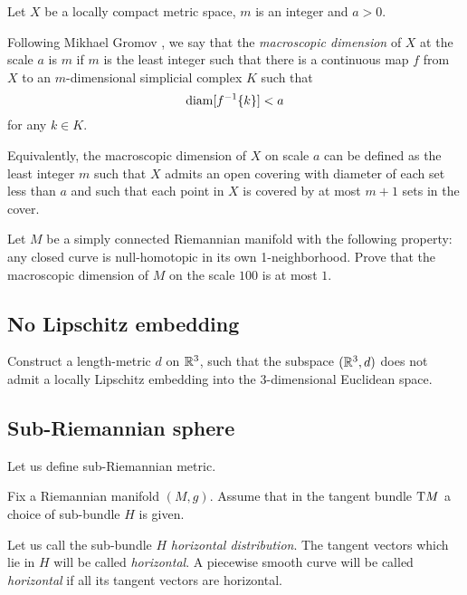 Let $X$ be a locally compact metric space,
$m$ is an integer
and $a>0$.

Following Mikhael Gromov \cite[see][]{gromov:macroscopic-dimension},
we say that the \emph{macroscopic dimension}  of $X$ at the scale $a$ is $m$
if $m$ is the least integer such that there is a continuous map $f$ from $X$ to an $m$-dimensional simplicial complex $K$
such that 
\[\operatorname{\rm diam}\nolimits[f^{-1}\{k\}]<a\]
for any $k\in K$.

Equivalently, the macroscopic dimension of $X$ on scale $a$ can be defined as 
the least integer $m$ such that $X$ admits an open covering with diameter of each set less than $a$ 
and such that each point in $X$ is covered by at most $m+1$ sets in the cover.

\begin{pr}
Let $M$ be a simply connected Riemannian manifold with the following property: 
any closed curve is null-homotopic 
in its own  1-neighborhood. 
Prove that the macroscopic dimension of $M$ on the scale $100$ is at most $1$.
\end{pr}

\subsection*{No Lipschitz embedding\hard}
\label{weird-metric} 

\begin{pr}
Construct a length-metric $d$ on $\mathbb{R}^3$,
such that 
the subspace $(\mathbb{R}^3,d)$ does not admit a locally Lipschitz embedding into the 3-dimensional Euclidean space.
\end{pr}

\subsection*{Sub-Riemannian sphere\thm}
\label{sub-Riemannian} 

Let us define sub-Riemannian metric.

Fix a Riemannian manifold $(M,g)$.
Assume that in the tangent bundle $\mathrm{T} M$ 
a choice of sub-bundle $H$ is given.

Let us call the sub-bundle $H$  \emph{horizontal distribution}.
The tangent vectors which lie in $H$ will be called {}\emph{horizontal}.
A piecewise smooth curve will be called {}\emph{horizontal}
if all its tangent vectors are horizontal.

